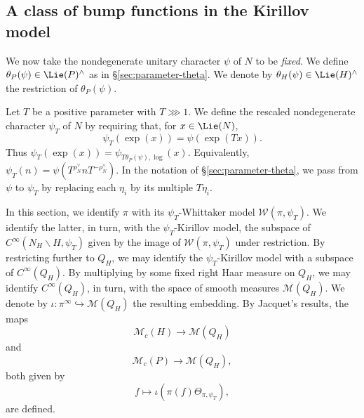 \subsection{A class of bump functions in the Kirillov model}\label{sec:class-bump-functions}
We now take the nondegenerate unitary character $\psi$ of $N$ to be \emph{fixed}.  We define $\theta_P(\psi) \in \Lie(P)^\wedge$ as in \S\ref{sec:parameter-theta}.  We denote by $\theta_H(\psi) \in \Lie(H)^\wedge$ the restriction of $\theta_P(\psi)$.   

Let $T$ be a positive parameter with $T \ggg 1$.  We define the rescaled nondegenerate character $\psi_T$ of $N$ by requiring that, for $x \in \Lie(N)$,
\begin{equation*}
  \psi_T(\exp(x)) = \psi(\exp(T x)).
\end{equation*}
Thus $\psi_T(\exp(x)) = \psi_{T \theta_P(\psi), \log}(x)$.  Equivalently, $\psi_T(n) = \psi (T^{\rho_N^\vee} n T^{-\rho_N^\vee})$.  In the notation of \S\ref{sec:parameter-theta}, we pass from $\psi$ to $\psi_T$ by replacing each $\eta_i$ by its multiple $T \eta_i$.

In this section, we identify $\pi$ with its $\psi_T$-Whittaker model $\mathcal{W}(\pi,\psi_T)$.  We identify the latter, in turn, with the $\psi_T$-Kirillov model, the subspace of $C^\infty(N_H \backslash H, \psi_T)$ given by the image of $\mathcal{W}(\pi, \psi_T)$ under restriction.  By restricting further to $Q_H$, we may identify the $\psi_T$-Kirillov model with a subspace of $C^\infty(Q_H)$.  By multiplying by some fixed right Haar measure on $Q_H$, we may identify $C^\infty(Q_H)$, in turn, with the space of smooth measures $\mathcal{M}(Q_H)$.  We denote by $\iota : \pi^\infty \hookrightarrow \mathcal{M}(Q_H)$ the resulting embedding.  By Jacquet's results, the maps
\begin{equation}\label{eq:mathc-right-mathc}
  \mathcal{M}_c(H) \rightarrow \mathcal{M}(Q_H)
\end{equation}
and
\begin{equation}\label{eq:crb6fqwwre}
  \mathcal{M}_c(P) \rightarrow \mathcal{M}(Q_H),
\end{equation}
both given by
\begin{equation*}
  f \mapsto \iota(\pi(f) \Theta_{\pi,\psi_T}),
\end{equation*}
are defined.

